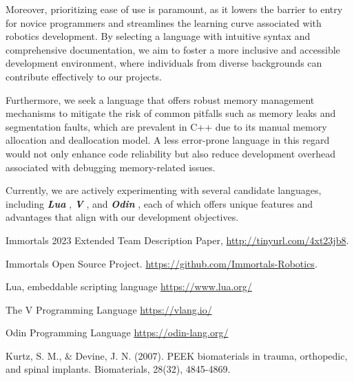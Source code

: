 \documentclass[runningheads]{llncs}
\begin{document}
Moreover, prioritizing ease of use is paramount, as it lowers the barrier to entry for novice programmers and streamlines the learning curve associated with robotics development. By selecting a language with intuitive syntax and comprehensive documentation, we aim to foster a more inclusive and accessible development environment, where individuals from diverse backgrounds can contribute effectively to our projects.

Furthermore, we seek a language that offers robust memory management mechanisms to mitigate the risk of common pitfalls such as memory leaks and segmentation faults, which are prevalent in C++ due to its manual memory allocation and deallocation model. A less error-prone language in this regard would not only enhance code reliability but also reduce development overhead associated with debugging memory-related issues.

Currently, we are actively experimenting with several candidate languages, including \textbf{\textit{Lua}} \cite{ref_3rd-lua}, \textbf{\textit{V}} \cite{ref_3rd-v-lang}, and \textbf{\textit{Odin}} \cite{ref_3rd-odin}, each of which offers unique features and advantages that align with our development objectives.

\newpage
\begin{thebibliography}{8}

Immortals 2023 Extended Team Description Paper, \url{http://tinyurl.com/4xt23jb8}.

Immortals Open Source Project. \url{https://github.com/Immortals-Robotics}.

Lua, embeddable scripting language \url{https://www.lua.org/}

The V Programming Language \url{https://vlang.io/}

Odin Programming Language \url{https://odin-lang.org/}

Kurtz, S. M., \& Devine, J. N. (2007). PEEK biomaterials in trauma, orthopedic, and spinal implants. Biomaterials, 28(32), 4845-4869.

\end{thebibliography}
\end{document}
